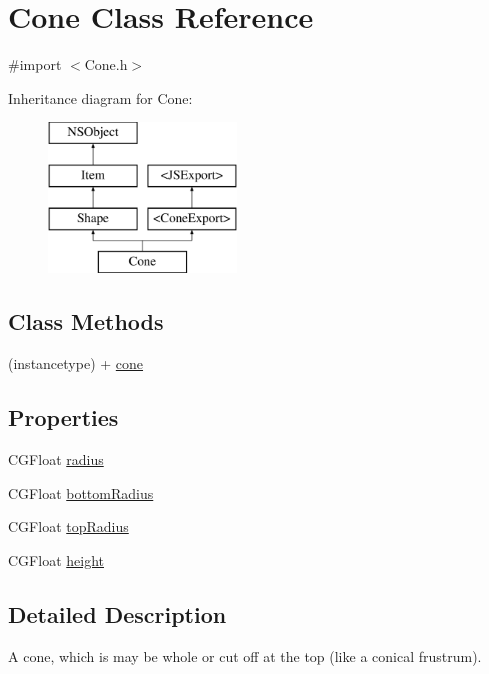 \hypertarget{interface_cone}{}\section{Cone Class Reference}
\label{interface_cone}


{\ttfamily \#import $<$Cone.\+h$>$}

Inheritance diagram for Cone\+:\begin{figure}[H]
\begin{center}
\leavevmode
\includegraphics[height=4.000000cm]{interface_cone}
\end{center}
\end{figure}
\subsection*{Class Methods}
\begin{DoxyCompactItemize}
\item 
(instancetype) + \hyperlink{interface_cone_a1bb76c98c19dbd219d7c466fc288ce4c}{cone}
\end{DoxyCompactItemize}
\subsection*{Properties}
\begin{DoxyCompactItemize}
\item 
C\+G\+Float \hyperlink{interface_cone_ac227a3bdc7372a8ae73a3d70a4644b99}{radius}
\item 
C\+G\+Float \hyperlink{interface_cone_a4c9e65faf1500b1bac399f0213318bd1}{bottom\+Radius}
\item 
C\+G\+Float \hyperlink{interface_cone_a0050c318410d187cadee5a4dce2087f3}{top\+Radius}
\item 
C\+G\+Float \hyperlink{interface_cone_ae423d684792ea4632334f06cb3c26fa4}{height}
\end{DoxyCompactItemize}


\subsection{Detailed Description}
A cone, which is may be whole or cut off at the top (like a conical frustrum). 

